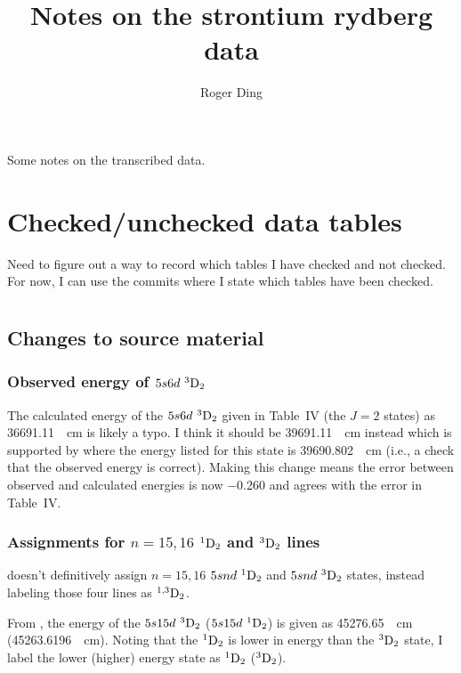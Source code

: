 \documentclass{article}
\title{Notes on the strontium rydberg data}
\author{Roger Ding}
\newcommand{\tsup}{\textsuperscript}													%
\newcommand{\tsub}{\textsubscript}														%
\newcommand{\SLJ}[3]{\tsup{#1}\textnormal{#2}\tsub{#3}}
\newcommand{\nSLJ}[4]{{#1}\textnormal{ }\SLJ{#2}{#3}{#4}}
\begin{document}
\maketitle


Some notes on the transcribed data.

\section{Checked/unchecked data tables}

Need to figure out a way to record which tables I have checked and not checked. For now, I can use the commits where I state which tables have been checked.

\section{}

\subsection{Changes to source material}

\subsubsection{Observed energy of $\nSLJ{5s6d}{3}{D}{2}$}

The calculated energy of the $\nSLJ{5s6d}{3}{D}{2}$ given in Table~IV (the ${J=2}$ states) as \SI{36691.11}{\per\cm} is likely a typo. I think it should be \SI{39691.11}{\per\cm} instead which is supported by \cite{san_2010} where the energy listed for this state is \SI{39690.802}{\per\cm} (i.e., a check that the observed energy is correct). Making this change means the error between observed and calculated energies is now \num{-0.260} and agrees with the error in Table~IV.

\subsubsection{Assignments for ${n=15,16}$ ${\SLJ{1}{D}{2}}$ and ${\SLJ{3}{D}{2}}$ lines}

\citeauthor{esh_1977} doesn't definitively assign ${n=15,16}$ ${\nSLJ{5snd}{1}{D}{2}}$ and ${\nSLJ{5snd}{3}{D}{2}}$ states, instead labeling those four lines as ${\SLJ{1,3}{D}{2}}$.

From \cite{san_2010}, the energy of the ${\nSLJ{5s15d}{3}{D}{2}}$ (${\nSLJ{5s15d}{1}{D}{2}}$) is given as \SI{45276.65}{\per\cm} (\SI{45263.6196}{\per\cm}). Noting that the $\SLJ{1}{D}{2}$ is lower in energy than the $\SLJ{3}{D}{2}$ state, I label the lower (higher) energy state as $\SLJ{1}{D}{2}$ ($\SLJ{3}{D}{2}$).
\end{document}
